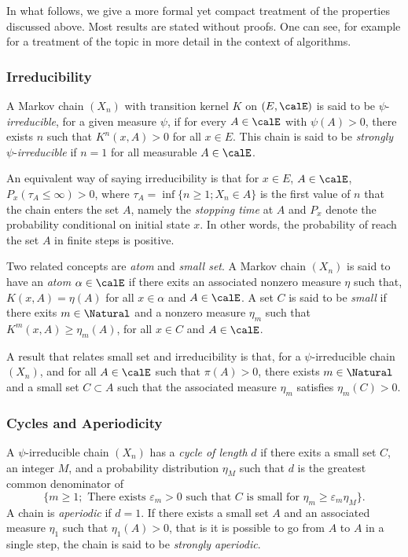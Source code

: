 In what follows, we give a more formal yet compact treatment of the properties
discussed above. Most results are stated without proofs. One can see, for
example \cite[][chap.~6]{Robert:2004tn} for a treatment of the topic in more
detail in the context of \mcmc algorithms.

\subsubsection{Irreducibility}
\label{ssub:Irreducibility}

A Markov chain $(X_n)$ with transition kernel $K$ on $(E,\calE)$ is said to be
$\psi$-\emph{irreducible}, for a given measure $\psi$, if for every
$A\in\calE$ with $\psi(A)>0$, there exists $n$ such that $K^n(x,A)>0$ for all
$x\in E$. This chain is said to be \emph{strongly} $\psi$-\emph{irreducible}
if $n=1$ for all measurable $A\in\calE$.

An equivalent way of saying irreducibility is that for $x\in E$, $A\in\calE$,
$P_x(\tau_A\le\infty) > 0$, where $\tau_A = \inf\{n\ge1;X_n\in A\}$ is the
first value of $n$ that the chain enters the set $A$, namely the
\emph{stopping time} at $A$ and $P_x$ denote the probability conditional on
initial state $x$. In other words, the probability of reach the set $A$ in
finite steps is positive.

Two related concepts are \emph{atom} and \emph{small set}. A Markov chain
$(X_n)$ is said to have an \emph{atom} $\alpha\in\calE$  if there exits an
associated nonzero measure $\eta$ such that, $K(x,A) = \eta(A)$ for all
$x\in\alpha$ and $A\in\calE$. A set $C$ is said to be \emph{small} if there
exits $m\in\Natural$ and a nonzero measure $\eta_m$ such that
$K^m(x,A)\ge\eta_m(A)$, for all $x\in C$ and $A\in\calE$.

A result that relates small set and irreducibility is that, for a
$\psi$-irreducible chain $(X_n)$, and for all $A\in\calE$ such that
$\pi(A)>0$, there exists $m\in\Natural$ and a small set $C\subset A$ such that
the associated measure $\eta_m$ satisfies $\eta_m(C) > 0$.

\subsubsection{Cycles and Aperiodicity}
\label{ssub:Cycles and Aperiodicity}

A $\psi$-irreducible chain $(X_n)$ has a \emph{cycle of length} $d$ if there
exits a small set $C$, an integer $M$, and a probability distribution $\eta_M$
such that $d$ is the greatest common denominator of
\begin{equation*}
  \{m\ge1;\text{ There exists }\varepsilon_m > 0\text{ such that }C\text{ is
    small for }\eta_m\ge\varepsilon_m\eta_M\}.
\end{equation*}
A chain is \emph{aperiodic} if $d = 1$. If there exists a small set $A$ and an
associated measure $\eta_1$ such that $\eta_1(A) > 0$, that is it is possible
to go from $A$ to $A$ in a single step, the chain is said to be
\emph{strongly aperiodic}.

